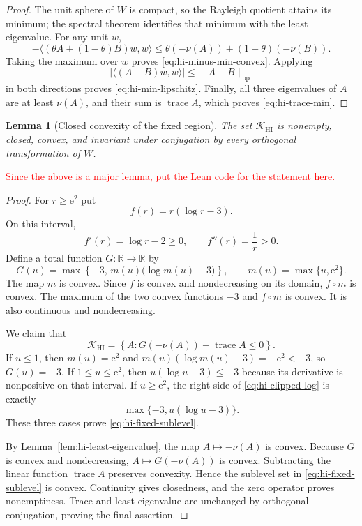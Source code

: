 \documentclass[10pt]{coll-l}
\newcommand{\trace}{\operatorname{trace}}
\newtheorem{lemma}[theorem]{Lemma}
\theoremstyle{definition}
\theoremstyle{remark}
\numberwithin{section}{chapter}
\numberwithin{equation}{chapter}
\begin{document}
\begin{proof}
The unit sphere of $W$ is compact, so the Rayleigh quotient attains its
minimum; the spectral theorem identifies that minimum with the least
eigenvalue.  For any unit $w$,
\[
 -\langle(\theta A+(1-\theta)B)w,w\rangle
 \leq\theta(-\nu(A))+(1-\theta)(-\nu(B)).
\]
Taking the maximum over $w$ proves
\eqref{eq:hi-minus-min-convex}.  Applying
\[
 |\langle(A-B)w,w\rangle|\leq\|A-B\|_{\mathrm{op}}
\]
in both directions proves \eqref{eq:hi-min-lipschitz}.  Finally, all three
eigenvalues of $A$ are at least $\nu(A)$, and their sum is $\trace A$,
which proves \eqref{eq:hi-trace-min}.
\end{proof}

\begin{lemma}[Closed convexity of the fixed region]
\label{lem:hi-fixed-region-convex}
The set $\mathcal K_{\mathrm{HI}}$ is nonempty, closed, convex, and invariant
under conjugation by every orthogonal transformation of $W$.
\end{lemma}

\textcolor{red}{Since the above is a major lemma, put the Lean code for the statement here.}

\begin{proof}
For $r\geq\mathrm e^2$ put
\[
                 f(r)=r(\log r-3).
\]
On this interval,
\[
        f'(r)=\log r-2\geq0,
        \qquad f''(r)=\frac1r>0.
\]
Define a total function $G:\mathbb R\to\mathbb R$ by
\begin{equation}
 G(u)=
 \max\left\{
     -3,\,
     m(u)\bigl(\log m(u)-3\bigr)
 \right\},
 \qquad
 m(u)=\max\{u,\mathrm e^2\}.                              \label{eq:hi-clipped-log}
\end{equation}
The map $m$ is convex.  Since $f$ is convex and nondecreasing on its
domain, $f\circ m$ is convex.  The maximum of the two convex functions
$-3$ and $f\circ m$ is convex.  It is also continuous and nondecreasing.

We claim that
\begin{equation}
 \mathcal K_{\mathrm{HI}}
   =
 \left\{
    A:G(-\nu(A))-\trace A\leq0
 \right\}.                                                \label{eq:hi-fixed-sublevel}
\end{equation}
If $u\leq1$, then $m(u)=\mathrm e^2$ and
$m(u)(\log m(u)-3)=-\mathrm e^2<-3$, so $G(u)=-3$.
If $1\leq u\leq\mathrm e^2$, then
$u(\log u-3)\leq-3$ because its derivative is nonpositive on that
interval.  If $u\geq\mathrm e^2$, the right side of
\eqref{eq:hi-clipped-log} is exactly
\[
                 \max\{-3,u(\log u-3)\}.
\]
These three cases prove \eqref{eq:hi-fixed-sublevel}.

By Lemma~\ref{lem:hi-least-eigenvalue}, the map
$A\mapsto-\nu(A)$ is convex.  Because $G$ is convex and nondecreasing,
$A\mapsto G(-\nu(A))$ is convex.  Subtracting the linear function
$\trace A$ preserves convexity.  Hence the sublevel set in
\eqref{eq:hi-fixed-sublevel} is convex.  Continuity gives closedness, and
the zero operator proves nonemptiness.  Trace and least eigenvalue are
unchanged by orthogonal conjugation, proving the final assertion.
\end{proof}
\end{document}
